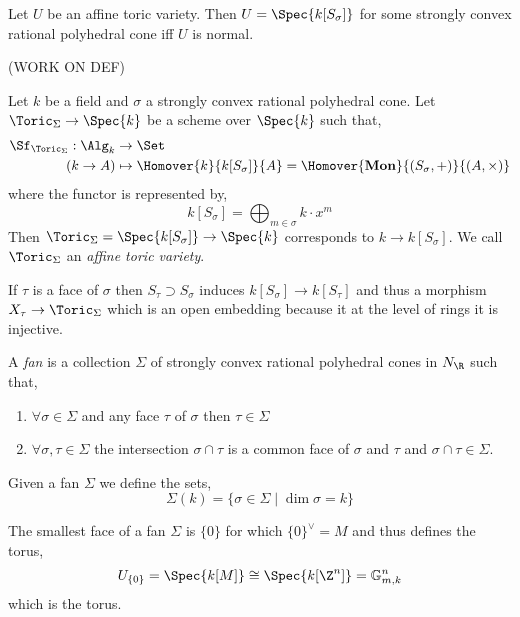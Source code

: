\begin{theorem}
Let $U$ be an affine toric variety. Then $U = \Spec{k[S_\sigma]}$ for some strongly convex rational polyhedral cone iff $U$ is normal. 
\end{theorem}

(WORK ON DEF)

\begin{definition}
Let $k$ be a field and $\sigma$ a strongly convex rational polyhedral cone. Let $\Toric_\Sigma \to \Spec{k}$ be a scheme over $\Spec{k}$ such that,
\begin{align*}
\Sf_{\Toric_\Sigma} : \Alg_k & \to \Set
\\
(k \to A) & \mapsto \Homover{k}{k[S_\sigma]}{A} = \Homover{\mathbf{Mon}}{(S_\sigma, +)}{(A, \times)}
\end{align*}
where the functor is represented by,
\[ k[S_\sigma] = \bigoplus_{m \in \sigma} k \cdot x^m \]
Then $\Toric_\Sigma = \Spec{k[S_\sigma]} \to \Spec{k}$ corresponds to $k \to k[S_\sigma]$. 
We call $\Toric_\Sigma$ an \textit{affine toric variety}.
\end{definition}

\begin{remark}
If $\tau$ is a face of $\sigma$ then $S_\tau \supset S_\sigma$ induces $k[S_\sigma] \to k[S_\tau]$ and thus a morphism $X_\tau \to \Toric_\Sigma$ which is an open embedding because it at the level of rings it is injective. 
\end{remark}

\begin{definition}
A \textit{fan} is a collection $\Sigma$ of strongly convex rational polyhedral cones in $N_\R$ such that,
\begin{enumerate}
\item $\forall \sigma \in \Sigma$ and any face $\tau$ of $\sigma$ then $\tau \in \Sigma$

\item $\forall \sigma, \tau \in \Sigma$ the intersection $\sigma \cap \tau$ is a common face of $\sigma$ and $\tau$ and $\sigma \cap \tau \in \Sigma$.
\end{enumerate}
Given a fan $\Sigma$ we define the sets,
\[ \Sigma(k) = \{ \sigma \in \Sigma \mid \dim{\sigma} = k \} \]
\end{definition}

\begin{remark}
The smallest face of a fan $\Sigma$ is $\{ 0 \}$ for which $\{ 0 \}^\vee = M$ and thus defines the torus,
\[ U_{\{0\}} = \Spec{k[M]} \cong \Spec{k[\Z^n]} = \mathbb{G}_{m,k}^n \]
which is the torus. 
\end{remark}

